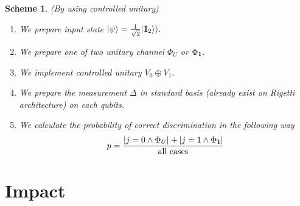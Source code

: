 \documentclass[preprint,12pt, a4paper]{elsarticle}
\newcommand{\ket}[1]{\ensuremath{|#1\rangle}}
\newcommand{\1}{{\rm 1\hspace{-0.9mm}l}}
\newcommand{\Id}{{\rm 1\hspace{-0.9mm}l}}
\newcommand{\ee}{\ensuremath{\mathrm{e}}}
\newcommand{\ii}{\ensuremath{\mathrm{i}}}
\newcommand{\PP}{\mathcal{P}}
\newtheorem{scheme}{Scheme}
\begin{document}
\begin{scheme}(By using controlled unitary)
%	
\begin{enumerate}
\item We prepare input state $\ket{\psi} = \frac{1}{\sqrt{2} } | \Id_2 \rangle 
\rangle. $
\item We prepare one of two unitary channel $\Phi_{U} $ or $\Phi_{\1}$. 
\item We implement controlled unitary $V_0 \oplus V_1$.
\item We prepare the measurement $\Delta$ in standard basis (already exist on 
Rigetti architecture) on each qubits.
\item We calculate the probability of correct discrimination in the following 
way
\begin{equation}
p = \frac{|j=0 \wedge \Phi_{U} | + |j=1 \wedge \Phi_{\1}|}{\text{all 
cases}}
\end{equation}
\end{enumerate}
\end{scheme}










\section{Impact }
\end{document}
